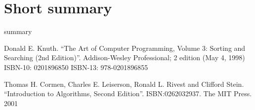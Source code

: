 \documentclass{article}
\begin{document}
\section{Short summary} 
summary

\begin{thebibliography}{99}

Donald E. Knuth. ``The Art of Computer Programming, Volume 3: Sorting and Searching (2nd Edition)''. Addison-Wesley Professional; 2 edition (May 4, 1998) ISBN-10: 0201896850 ISBN-13: 978-0201896855

Thomas H. Cormen, Charles E. Leiserson, Ronald L. Rivest and Clifford Stein. 
``Introduction to Algorithms, Second Edition''. ISBN:0262032937. The MIT Press. 2001

\end{thebibliography}

\ifx\wholebook\relax\else
\end{document}
